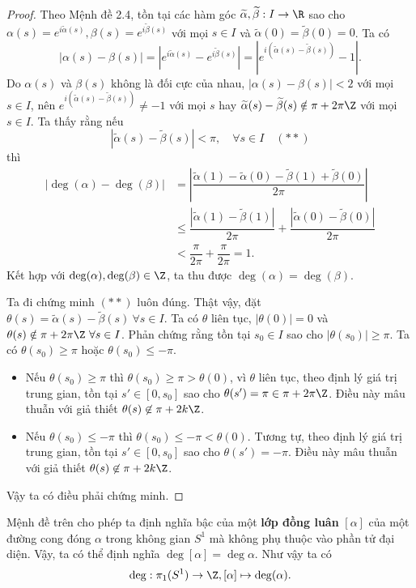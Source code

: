 	\begin{proof}
		Theo Mệnh đề 2.4, tồn tại các hàm góc $\widetilde{\alpha}, \widetilde{\beta}: I \to \R$ sao cho $\alpha(s)=e^{i\widetilde{\alpha}(s)},\beta(s)=e^{i\widetilde{\beta}(s)}$ với mọi $s\in I$ và $\widetilde{\alpha}(0) =  \widetilde{\beta}(0)=0$. Ta có
		\[
		|\alpha(s)-\beta(s)|= |e^{i\widetilde{\alpha}(s)}-e^{i\widetilde{\beta}(s)}|= |e^{i(\widetilde{\alpha}(s)-\widetilde{\beta}(s))}-1|.
		\]
		Do $\alpha(s)$ và $\beta(s)$ không là đối cực của nhau, $|\alpha(s)-\beta(s)|<2$ với mọi $s\in I$, nên
		$e^{i(\widetilde{\alpha}(s)-\widetilde{\beta}(s))}\not=-1$ với mọi $s$ hay %
		$\widetilde{\alpha}(s) - \widetilde{\beta}(s) \notin \pi+2\pi\Z$ với mọi $s \in I$. 
		Ta thấy rằng nếu %
		\[
		|\widetilde{\alpha}(s) - \widetilde{\beta}(s)| < \pi, \quad \forall s\in I \quad (**)
		\]
		thì
		\begin{align*}
			|\deg(\alpha)-\deg(\beta)|
			&=\left|\dfrac{\widetilde{\alpha}(1) - \widetilde{\alpha}(0) - \widetilde{\beta}(1) + \widetilde{\beta}(0)}{2\pi}\right|\\
			&\leq \dfrac{|\widetilde{\alpha}(1) - \widetilde{\beta}(1)|}{2\pi}+\dfrac{|\widetilde{\alpha}(0) - \widetilde{\beta}(0)|}{2\pi}\\
			&<\dfrac{\pi}{2\pi} + \dfrac{\pi}{2\pi}=1.
		\end{align*}
		Kết hợp với $\deg(\alpha), \deg(\beta) \in \Z$, ta thu được  %
		$\deg(\alpha) = \deg(\beta)$.
		
		Ta đi chứng minh $(**)$ luôn đúng. Thật vậy, đặt $\theta(s)=\widetilde{\alpha}(s)-\widetilde{\beta}(s)~\forall s\in I$. %
		Ta có $\theta$ liên tục, %
		$|\theta(0)|=0$ %
		và $\theta(s)\notin \pi+2\pi\Z~\forall s\in I$. 			
		Phản chứng rằng tồn tại $s_0\in I$ sao cho $|\theta(s_0)|\geq \pi$. Ta có $\theta(s_0)\geq \pi$ hoặc $\theta(s_0)\leq -\pi$.%
		\begin{itemize}
			\item Nếu $\theta(s_0)\geq \pi$ thì
			$\theta(s_0)\geq \pi >\theta(0)$, vì $\theta$ liên tục, theo định lý giá trị trung gian, tồn tại $s'\in [0,s_0]$ sao cho $\theta(s')=\pi \in \pi+2\pi\Z$. Điều này mâu thuẫn với giả thiết $\theta(s)\not\in\pi+2k\Z$.
			\item Nếu $\theta(s_0)\leq -\pi$ thì 				
			$\theta(s_0)\leq -\pi <\theta(0)$. Tương tự, theo định lý giá trị trung gian, tồn tại $s'\in [0,s_0]$ sao cho $\theta(s')=-\pi$. Điều này mâu thuẫn với giả thiết $\theta(s)\not\in\pi+2k\Z$.
		\end{itemize}
		Vậy ta có điều phải chứng minh.
	\end{proof}
	Mệnh đề trên cho phép ta định nghĩa bậc của một \textbf{lớp đồng luân} $[\alpha]$ của một đường cong đóng $\alpha$ trong không gian $S^1$ mà không phụ thuộc vào phần tử đại diện. Vậy, ta có thể định nghĩa 
	$\deg [\alpha] =\deg \alpha$. Như vậy ta có 
	\[
	\deg: \pi_1(S^1) \to \Z, [\alpha]\mapsto \deg(\alpha).
	\]
	
